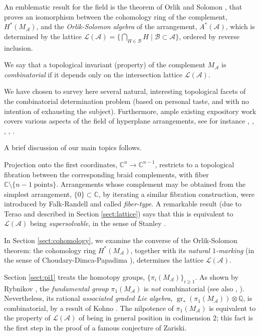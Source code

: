 \documentclass[psamsfonts]{conm-p-l}
\theoremstyle{definition}
\theoremstyle{remark}
\numberwithin{equation}{section}
\newcommand{\A}{{\mathcal A}}
\newcommand{\B}{{\mathcal B}}
\newcommand{\Q}{\mathbb{Q}}
\newcommand{\C}{\mathbb{C}}
\DeclareMathOperator{\gr}{gr}
\begin{document}
An emblematic result for the field is the theorem of Orlik and Solomon \cite{OS}, that proves 
an isomorphism 
between the cohomology ring of the complement, $H^*(M_\A)$, and  the {\it Orlik-Solomon algebra} 
of the arrangement, $A^*(\A)$, which is  determined by the lattice 
$\mathcal L(\A)=\{\bigcap_{H \in{\B}}H\;|\;\B \subset \A\}$, ordered by reverse inclusion.

We say that a topological invariant (property) of the complement $M_{\A}$ is {\em combinatorial} 
if it depends only on the intersection lattice $\mathcal L(\A)$.
  
We have chosen to survey here several natural, interesting topological facets of the 
combinatorial determination problem (based on personal taste, and with no intention of
exhausting the subject).
Furthermore, ample existing expository work covers various aspects of the field of hyperplane arrangements, see for instance \cite{FR1}, \cite{FR2}, \cite{Fa0}, \cite{S1}, \cite{Y1}.

A brief discussion of our main topics follows.

Projection onto the first coordinates, $\C^n \to \C^{n-1}$, restricts to a topological fibration
between the corresponding braid complements, with fiber $\C \setminus \{ n-1 \; \text{points} \}$.
Arrangements whose complement may be obtained from the simplest arrangement, $\{ 0\}\subset \C$,
by iterating a similar fibration construction, were introduced by Falk-Randell \cite{FR0} and called
{\em fiber-type}. A remarkable result (due to Terao \cite{Te} and described in Section \ref{sect:lattice})
says that this is equivalent to $\mathcal L(\A)$ being {\em supersolvable}, in the sense of Stanley \cite{St}.

In Section \ref{sect:cohomology}, we examine the converse of the Orlik-Solomon theorem: the
cohomology ring $H^*(M_\A)$, together with its {\em natural $1$-marking} (in the sense of
Choudary-Dimca-Papadima \cite{CDP}), determines the lattice $\mathcal L(\A)$.

Section \ref{sect:pi1} treats the homotopy groups, $\{ \pi_i(M_{\A})\}_{i\ge 1}$. As shown by
Rybnikov \cite{Ryb}, the {\em fundamental group} $\pi_1(M_{\A})$ is {\em not} combinatorial (see also \cite{AAB0}, \cite{AAB1}).
Nevertheless, its rational {\em associated graded Lie algebra}, $\gr_*(\pi_1(M_{\A}))\otimes \Q$,
is combinatorial, by a result of Kohno \cite{Ko}. The nilpotence of $\pi_1(M_{\A})$ is
equivalent to the property of $\mathcal L(\A)$ of  being in general position
in codimension $2$; this fact is the first step in the proof of a famous conjecture of Zariski.
\end{document}
